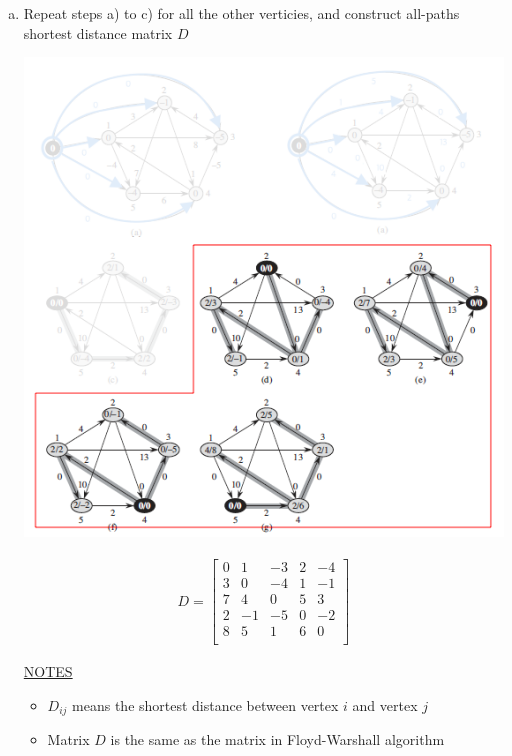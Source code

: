 \documentclass[12pt]{article}
\begin{document}
\begin{enumerate}[1.]
\begin{itemize}
\begin{enumerate}[1.]
\begin{enumerate}[a)]
                \item Repeat steps a) to c) for all the other verticies, and construct all-paths shortest distance matrix $D$

                \begin{center}
                \includegraphics[width=\linewidth]{images/worksheet_4_solution_63.png}
                \end{center}

                \begin{align*}
                    D = \begin{bmatrix}
                        0 & 1 & -3 & 2 & -4\\
                        3 & 0 & -4 & 1 & -1\\
                        7 & 4 & 0 & 5 & 3\\
                        2 & -1 & -5 & 0 & -2\\
                        8 & 5 & 1 & 6 & 0\\
                    \end{bmatrix}
                \end{align*}

                \bigskip

                \underline{NOTES}

                \begin{itemize}
                    \item $D_{ij}$ means the shortest distance between vertex $i$ and vertex $j$
                    \item Matrix $D$ is the same as the matrix in Floyd-Warshall algorithm
                \end{itemize}
            \end{enumerate}


\end{enumerate}
\end{itemize}
\end{enumerate}
\end{document}
